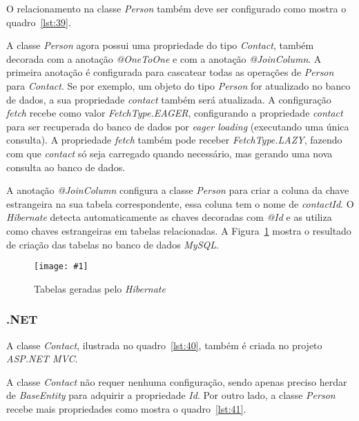 \documentclass[a4paper,12pt]{article}
\newcommand{\figura}[3] {
	\begin{figure}[ht]
		\centering
		\texttt{[image: \#1]}
		\caption{#2}
		\label{#3}
	\end{figure}
	\FloatBarrier
}
\newcommand{\est}[1] {
\textit{#1}}
\newcommand{\classe}[1] {
\textit{#1}}
\newcommand{\annotation}[1] {
\textit{#1}}
\newcommand{\javacode}[3] {
	
}
\newcommand{\sharpcode}[3] {
	
}
\begin{document}
O relacionamento na classe \classe{Person} também deve ser configurado como mostra o quadro~\ref{lst:39}.

\javacode{code/39.txt}{Classe \classe{Person} com relacionamento para \classe{Contact}}{lst:39}

A classe \classe{Person} agora possui uma propriedade do tipo \classe{Contact}, também decorada com a anotação \annotation{@OneToOne} e com a anotação \annotation{@JoinColumn}. A primeira anotação é configurada para cascatear todas as operações de \classe{Person} para \classe{Contact}. Se por exemplo, um objeto do tipo \classe{Person} for atualizado no banco de dados, a sua propriedade \est{contact} também será atualizada. A configuração \est{fetch} recebe como valor \classe{FetchType.EAGER}, configurando a propriedade \est{contact} para ser recuperada do banco de dados por \est{eager loading} (executando uma única consulta). A propriedade \est{fetch} também pode receber \classe{FetchType.LAZY}, fazendo com que \est{contact} só seja carregado quando necessário, mas gerando uma nova consulta ao banco de dados.

A anotação \annotation{@JoinColumn} configura a classe \classe{Person} para criar a coluna da chave estrangeira na sua tabela correspondente, essa coluna tem o nome de \est{contactId}. O \est{Hibernate} detecta automaticamente as chaves decoradas com \annotation{@Id} e as utiliza como chaves estrangeiras em tabelas relacionadas. A Figura~\ref{fig:36} mostra o resultado de criação das tabelas no banco de dados \est{MySQL}. 

\figura{36.png}{Tabelas geradas pelo \est{Hibernate}}{fig:36}

\subsubsection{.NET}

A classe \classe{Contact}, ilustrada no quadro~\ref{lst:40}, também é criada no projeto \est{ASP.NET MVC}.

\sharpcode{code/40.txt}{Classe \classe{Contact} no projeto \est{ASP.NET MVC}}{lst:40}

A classe \classe{Contact} não requer nenhuma configuração, sendo apenas preciso herdar de \classe{BaseEntity} para adquirir a propriedade \est{Id}. Por outro lado, a classe \classe{Person} recebe mais propriedades como mostra o quadro~\ref{lst:41}.

\sharpcode{code/41.txt}{Classe \classe{Person} no projeto \est{ASP.NET} com novas propriedades}{lst:41}
\end{document}

